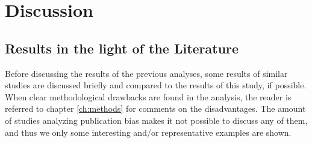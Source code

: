 \documentclass[11pt,a4paper,twoside]{book}\usepackage[]{graphicx}\usepackage[]{color}
\begin{document}
% 












\chapter{Discussion} \label{ch:Discussion}

\section{Results in the light of the Literature}\label{sec:discussion.results}

Before discussing the results of the previous analyses, some results of similar studies are discussed briefly and compared to the results of this study, if possible.
When clear methodological drawbacks are found in the analysis, the reader is referred to chapter \ref{ch:methods} for comments on the disadvantages. The amount of studies analyzing publication bias makes it not possible to discuss any of them, and thus we only some interesting and/or representative examples are shown.
\end{document}
